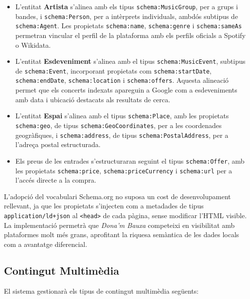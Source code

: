 \begin{itemize}
    \item L'entitat \textbf{Artista} s'alinea amb els tipus \texttt{schema:MusicGroup}, per a grups i bandes, i \texttt{schema:Person}, per a intèrprets individuals, ambdós subtipus de \texttt{schema:Agent}. Les propietats \texttt{schema:name}, \texttt{schema:genre} i \texttt{schema:sameAs} permetran vincular el perfil de la plataforma amb els perfils oficials a Spotify o Wikidata.
    \item L'entitat \textbf{Esdeveniment} s'alinea amb el tipus \texttt{schema:MusicEvent}, subtipus de \texttt{schema:Event}, incorporant propietats com \texttt{schema:startDate}, \texttt{schema:endDate}, \texttt{schema:location} i \texttt{schema:offers}. Aquesta alineació permet que els concerts indexats apareguin a Google com a esdeveniments amb data i ubicació destacats als resultats de cerca.
    \item L'entitat \textbf{Espai} s'alinea amb el tipus \texttt{schema:Place}, amb les propietats \texttt{schema:geo}, de tipus \texttt{schema:GeoCoordinates}, per a les coordenades geogràfiques, i \texttt{schema:address}, de tipus \texttt{schema:PostalAddress}, per a l'adreça postal estructurada.
    \item Els preus de les entrades s'estructuraran seguint el tipus \texttt{schema:Offer}, amb les propietats \texttt{schema:price}, \texttt{schema:priceCurrency} i \texttt{schema:url} per a l'accés directe a la compra.
\end{itemize}

L'adopció del vocabulari Schema.org no suposa un cost de desenvolupament rellevant, ja que les propietats s'injecten com a metadades de tipus \texttt{application/ld+json} al \texttt{<head>} de cada pàgina, sense modificar l'HTML visible. La implementació permetrà que \textit{Dona'm Bauxa} competeixi en visibilitat amb plataformes molt més grans, aprofitant la riquesa semàntica de les dades locals com a avantatge diferencial.

\subsection{Contingut Multimèdia}

El sistema gestionarà els tipus de contingut multimèdia següents:


